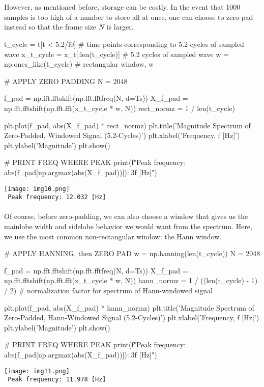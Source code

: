 \documentclass{report}
\begin{document}
\\ \\
However, as mentioned before, storage can be costly. In the event that 1000 samples is too high of a number to store all at once, 
one can choose to zero-pad instead so that the frame size $N$ is larger.
\begin{python}
t_cycle = t[t < 5.2/f0]                # time points corresponding to 5.2 cycles of sampled wave
x_t_cycle = x_t[:len(t_cycle)]         # 5.2 cycles of sampled wave
w = np.ones_like(t_cycle)              # rectangular window, w

# APPLY ZERO PADDING
N = 2048

f_pad = np.fft.fftshift(np.fft.fftfreq(N, d=Ts))
X_f_pad = np.fft.fftshift(np.fft.fft(x_t_cycle * w, N))
rect_normz = 1 / len(t_cycle)          

plt.plot(f_pad, abs(X_f_pad) * rect_normz)
plt.title('Magnitude Spectrum of Zero-Padded, \n Windowed Signal (5.2-Cycles)')
plt.xlabel('Frequency, f [Hz]')
plt.ylabel('Magnitude')
plt.show()

# PRINT FREQ WHERE PEAK
print(f"Peak frequency: {abs(f_pad[np.argmax(abs(X_f_pad))]):.3f} [Hz]")
\end{python}
\texttt{[image: img10.png]} \\ 
\texttt{ Peak frequency: 12.032 [Hz]}
\\ \\
Of course, before zero-padding, we can also choose a window that gives us the mainlobe width and 
sidelobe behavior we would want from the spectrum. Here, we use the most common non-rectangular window: 
the Hann window.
\begin{python}
# APPLY HANNING, then ZERO PAD
w = np.hanning(len(t_cycle))
N = 2048

f_pad = np.fft.fftshift(np.fft.fftfreq(N, d=Ts))   
X_f_pad = np.fft.fftshift(np.fft.fft(x_t_cycle * w, N))
hann_normz = 1 / ((len(t_cycle) - 1) / 2) # normalization factor for spectrum of Hann-windowed signal

plt.plot(f_pad, abs(X_f_pad) * hann_normz)
plt.title('Magnitude Spectrum of Zero-Padded, \n Hann-Windowed Signal (5.2-Cycles)')
plt.xlabel('Frequency, f [Hz]')
plt.ylabel('Magnitude')
plt.show()

# PRINT FREQ WHERE PEAK
print(f"Peak frequency: {abs(f_pad[np.argmax(abs(X_f_pad))]):.3f} [Hz]")
\end{python}
\texttt{[image: img11.png]} \\ 
\texttt{ Peak frequency: 11.978 [Hz]}
\end{document}
